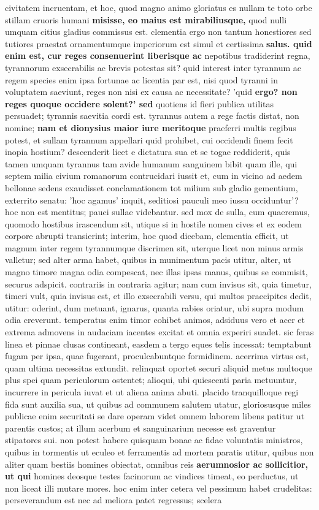 civitatem incruentam, et hoc, quod magno animo gloriatus es nullam te toto orbe stillam cruoris humani \textbf{misisse, eo maius est mirabiliusque,} quod nulli umquam citius gladius commissus est. clementia ergo non tantum honestiores sed tutiores praestat ornamentumque imperiorum est simul et certissima \textbf{salus. quid enim \textbf{\textbf{est, cur reges consenuerint} liberisque} ac} nepotibus tradiderint regna, tyrannorum exsecrabilis ac brevis potestas sit? quid interest inter tyrannum ac regem species enim ipsa fortunae ac licentia par est, nisi quod tyranni in voluptatem saeviunt, reges non nisi ex causa ac necessitate? 'quid \textbf{ergo? non reges quoque occidere solent?' sed} quotiens id fieri publica utilitas persuadet; tyrannis saevitia cordi est. tyrannus autem a rege factis distat, non nomine; \textbf{nam et dionysius maior iure meritoque} praeferri multis regibus potest, et sullam tyrannum appellari quid prohibet, cui occidendi finem fecit inopia hostium? descenderit licet e dictatura sua et se togae reddiderit, quis tamen umquam tyrannus tam avide humanum sanguinem bibit quam ille, qui septem milia civium romanorum contrucidari iussit et, cum in vicino ad aedem bellonae sedens exaudisset conclamationem tot milium sub gladio gementium, exterrito senatu: 'hoc agamus' inquit, seditiosi pauculi meo iussu occiduntur'? hoc non est mentitus; pauci sullae videbantur. sed mox de sulla, cum quaeremus, quomodo hostibus irascendum sit, utique si in hostile nomen cives et ex eodem corpore abrupti transierint; interim, hoc quod dicebam, clementia efficit, ut magnum inter regem tyrannumque discrimen sit, uterque licet non minus armis valletur; sed alter arma habet, quibus in munimentum pacis utitur, alter, ut magno timore magna odia compescat, nec illas ipsas manus, quibus se commisit, securus adspicit. contrariis in contraria agitur; nam cum invisus sit, quia timetur, timeri vult, quia invisus est, et illo exsecrabili versu, qui multos praecipites dedit, utitur: oderint, dum metuant, ignarus, quanta rabies oriatur, ubi supra modum odia creverunt. temperatus enim timor cohibet animos, adsiduus vero et acer et extrema admovens in audaciam iacentes excitat et omnia experiri suadet. sic feras linea et pinnae clusas contineant, easdem a tergo eques telis incessat: temptabunt fugam per ipsa, quae fugerant, proculcabuntque formidinem. acerrima virtus est, quam ultima necessitas extundit. relinquat oportet securi aliquid metus multoque plus spei quam periculorum ostentet; alioqui, ubi quiescenti paria metuuntur, incurrere in pericula iuvat et ut aliena anima abuti. placido tranquilloque regi fida sunt auxilia sua, ut quibus ad communem salutem utatur, gloriosusque miles publicae enim securitati se dare operam videt omnem laborem libens patitur ut parentis custos; at illum acerbum et sanguinarium necesse est graventur stipatores sui. non potest habere quisquam bonae ac fidae voluntatis ministros, quibus in tormentis ut eculeo et ferramentis ad mortem paratis utitur, quibus non aliter quam bestiis homines obiectat, omnibus reis \textbf{aerumnosior ac sollicitior, ut qui} homines deosque testes facinorum ac vindices timeat, eo perductus, ut non liceat illi mutare mores. hoc enim inter cetera vel pessimum habet crudelitas: perseverandum est nec ad meliora patet regressus; scelera 